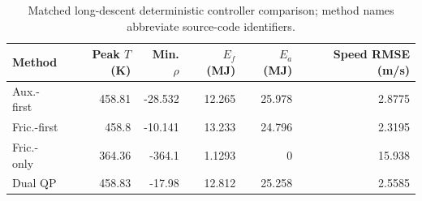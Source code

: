 \begin{table}[!t]
\centering
\caption{Matched long-descent deterministic controller comparison; method names abbreviate source-code identifiers.}
\label{tab:phase2m-controller}
\normalsize
\begin{tabular}{@{}lrrrrr@{}}
\hline
Method & Peak $T$ (K) & Min. $\rho$ & $E_f$ (MJ) & $E_a$ (MJ) & Speed RMSE (m/s) \\
\hline
Aux.-first & 458.81 & -28.532 & 12.265 & 25.978 & 2.8775 \\
Fric.-first & 458.8 & -10.141 & 13.233 & 24.796 & 2.3195 \\
Fric.-only & 364.36 & -364.1 & 1.1293 & 0 & 15.938 \\
Dual QP & 458.83 & -17.98 & 12.812 & 25.258 & 2.5585 \\
\hline
\end{tabular}
\end{table}
